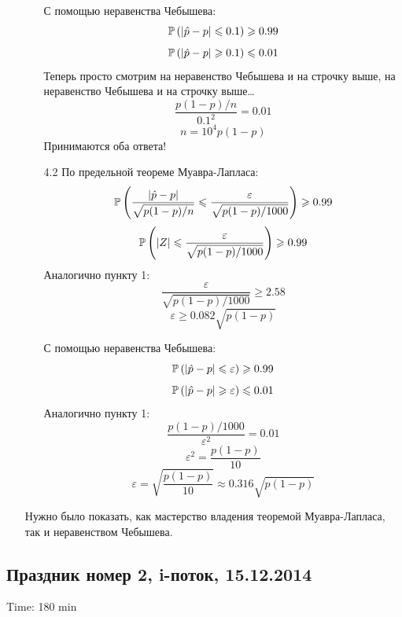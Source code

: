 \documentclass[12pt, a4paper]{article}\usepackage[]{graphicx}\usepackage[]{color}
\begin{document}
\begin{enumerate}
\begin{enumerate}
С помощью неравенства Чебышева:
\[ \P \left( |\hat{p} - p| \leqslant 0.1 \right) \geqslant 0.99 \]
\[ \P \left( |\hat{p} - p| \geqslant 0.1 \right) \leqslant 0.01 \]
Теперь просто смотрим на неравенство Чебышева и на строчку выше, на неравенство Чебышева и на строчку выше\ldots
\[ \dfrac{p(1-p)/n}{0.1^2} = 0.01\]
\[ n = 10^4 p(1-p) \]
Принимаются оба ответа!

\item[4.2] По предельной теореме Муавра-Лапласа:
\[ \P \left( \dfrac{|\hat{p} - p|}{\sqrt{p(1-p)/n}} \leqslant \dfrac{\varepsilon}{\sqrt{p(1-p)/1000}} \right) \geqslant 0.99 \]
\[ \P \left( |Z| \leqslant \dfrac{\varepsilon}{\sqrt{p(1-p)/1000}} \right) \geqslant 0.99 \]
Аналогично пункту 1:
\[ \dfrac{\varepsilon}{\sqrt{p(1-p)/1000}} \geqslant 2.58 \]
\[ \varepsilon \geqslant 0.082 \sqrt{p(1-p)} \]

С помощью неравенства Чебышева:
\[ \P \left( |\hat{p} - p| \leqslant \varepsilon \right) \geqslant 0.99 \]
\[ \P \left( |\hat{p} - p| \geqslant \varepsilon \right) \leqslant 0.01 \]
Аналогично пункту 1:
\[ \dfrac{p(1-p)/1000}{\varepsilon^2} = 0.01\]
\[ \varepsilon^2 = \dfrac{p(1-p)}{10} \]
\[ \varepsilon = \sqrt{\dfrac{p(1-p)}{10}} \approx 0.316 \sqrt{p(1-p)} \]

\end{enumerate}

Нужно было показать, как мастерство владения теоремой Муавра-Лапласа, так и неравенством Чебышева.


\end{enumerate}


\subsection{Праздник номер 2, i-поток, 15.12.2014}

Time: 180 min
\end{document}
